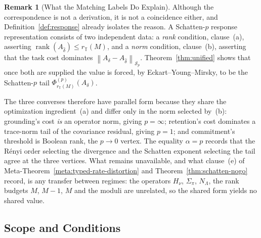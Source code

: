 \documentclass[12pt]{article}
\theoremstyle{definition}
\newtheorem{remark}[theorem]{Remark}
\DeclareMathOperator{\rank}{rank}
\newcommand{\norm}[1]{\left\lVert#1\right\rVert}
\newcommand{\Sp}[1]{\mathcal S_{#1}}
\begin{document}
\begin{remark}[What the Matching Labels Do Explain]
\label{rem:vertex-two-ingredients}
Although the correspondence is not a derivation, it is not a coincidence
either, and Definition~\ref{def:response} already isolates the reason.  A
Schatten-$p$ response representation consists of two independent data: a
\emph{rank} condition, clause~(a), asserting
$\rank(A_{\widehat\delta})\le r_{\mathbb T}(M)$, and a \emph{norm} condition,
clause~(b), asserting that the task cost dominates
$\norm{A_\delta-A_{\widehat\delta}}_{\Sp p}$.  Theorem~\ref{thm:unified}
shows that once both are supplied the value is forced, by
Eckart--Young--Mirsky, to be the Schatten-$p$ tail
$\Phi^{(p)}_{r_{\mathbb T}(M)}(A_\delta)$.

The three converses therefore have parallel form because they share the
optimization ingredient~(a) and differ only in the norm selected by~(b):
grounding's cost \emph{is} an operator norm, giving $p=\infty$; retention's
cost dominates a trace-norm tail of the covariance residual, giving $p=1$; and
commitment's threshold is Boolean rank, the $p\to0$ vertex.  The equality
$\alpha=p$ records that the R\'enyi order selecting the divergence and the
Schatten exponent selecting the tail agree at the three vertices.  What remains
unavailable, and what clause~(e) of
Meta-Theorem~\ref{meta:typed-rate-distortion} and
Theorem~\ref{thm:schatten-nogo} record, is any transfer between regimes: the
operators $H_\nu$, $\Sigma_\pi$, $N_\Lambda$, the rank budgets $M$, $M-1$, $M$
and the moduli are unrelated, so the shared form yields no shared value.
\end{remark}

\subsection{Scope and Conditions}
\label{subsec:exponent-scope}
\end{document}
